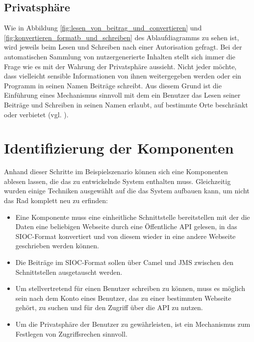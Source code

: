 
\subsection{Privatsphäre} %
\label{sub:privatsphäre}

Wie in Abbildung \ref{fig:lesen_von_beitrag_und_convertieren} und \ref{fig:konvertieren_formatb_und_schreiben} des Ablaufdiagramms zu sehen ist, wird jeweils beim Lesen und Schreiben nach einer Autorisation gefragt. Bei der automatischen Sammlung von nutzergenerierte Inhalten stellt sich immer die Frage wie es mit der Wahrung der Privatsphäre aussieht. Nicht jeder möchte, dass vielleicht sensible Informationen von ihnen weitergegeben werden oder ein Programm in seinen Namen Beiträge schreibt. Aus diesem Grund ist die Einführung eines Mechanismus sinnvoll mit dem ein Benutzer das Lesen seiner Beiträge und Schreiben in seinen Namen erlaubt, auf bestimmte Orte beschränkt oder verbietet (vgl. \cite[S.\,7]{Bojars2011}). 


\section{Identifizierung der Komponenten} %
\label{sec:identifizierung_der_komponenten}

Anhand dieser Schritte im Beispielszenario können sich eine Komponenten ablesen lassen, die das zu entwickelnde System enthalten muss. Gleichzeitig wurden einige Techniken ausgewählt auf die das System aufbauen kann, um nicht das Rad komplett neu zu erfinden: 

\begin{itemize} 
    \item Eine Komponente muss eine einheitliche Schnittstelle bereitstellen mit der die Daten eine beliebigen Webseite durch eine Öffentliche API gelesen, in das SIOC-Format konvertiert und von diesem wieder in eine andere Webseite geschrieben werden können. 

    \item Die Beiträge im SIOC-Format sollen über Camel und JMS zwischen den Schnittstellen ausgetauscht werden.

    \item Um stellvertretend für einen Benutzer schreiben zu können, muss es möglich sein nach dem Konto eines Benutzer, das zu einer bestimmten Webseite gehört, zu suchen und für den Zugriff über die API zu nutzen.

    \item Um die Privatsphäre der Benutzer zu gewährleisten, ist ein Mechanismus zum Festlegen von Zugriffsrechen sinnvoll.
\end{itemize}   



